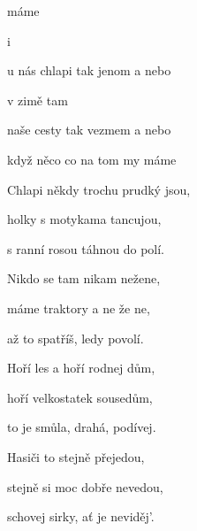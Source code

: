 

\zs
{} 

 

  

 máme 

 

  i 
\ks

\zr
{} u nás chlapi  tak jenom  a nebo 

v zimě tam   

 naše cesty  tak vezmem  a nebo 

když něco  co na tom  my máme 
\kr

\zs
Chlapi někdy trochu prudký jsou,

holky s motykama tancujou,

s ranní rosou táhnou do polí.

Nikdo se tam nikam nežene,

máme traktory a ne že ne,

až to spatříš, ledy povolí.
\ks

\zr\kr

\zs
Hoří les a hoří rodnej dům,

hoří velkostatek sousedům,

to je smůla, drahá, podívej.

Hasiči to stejně přejedou,

stejně si moc dobře nevedou,

schovej sirky, ať je neviděj'.
\ks

\zr\kr

\kp
